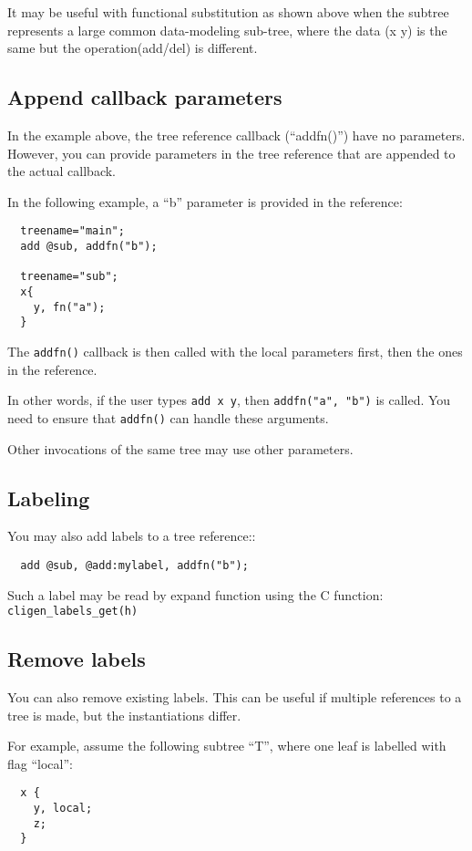 \documentclass[a4paper, 10pt] {article}
\begin{document}
It may be useful with functional substitution as shown above when the
subtree represents a large common data-modeling sub-tree, where the
data (x y) is the same but the operation(add/del) is different.

\subsection{Append callback parameters}

In the example above, the tree reference callback (``addfn()'') have no parameters. However, you can provide parameters in the tree reference that are appended to the actual callback.

In the following example, a ``b'' parameter is provided in the reference:
\begin{verbatim}
  treename="main";
  add @sub, addfn("b");

  treename="sub";
  x{
    y, fn("a");
  }
\end{verbatim}

The {\tt addfn()} callback is then called with the local parameters first, then the ones in the reference.

In other words, if the user types {\tt add x y}, then {\tt addfn("a", "b")} is called. You need to ensure that {\tt addfn()} can handle these arguments.

Other invocations of the same tree may use other parameters.

\subsection{Labeling}

You may also add labels to a tree reference::
\begin{verbatim}
  add @sub, @add:mylabel, addfn("b");
\end{verbatim}

Such a label may be read by expand function using the C function: {\tt cligen\_labels\_get(h)}

\subsection{Remove labels}

You can also remove existing labels. This can be useful if multiple references to a tree is made, but the instantiations differ.

For example, assume the following subtree ``T'', where one leaf is labelled with flag ``local'':
\begin{verbatim}
  x {
    y, local;
    z;
  }
\end{verbatim}
\end{document}
